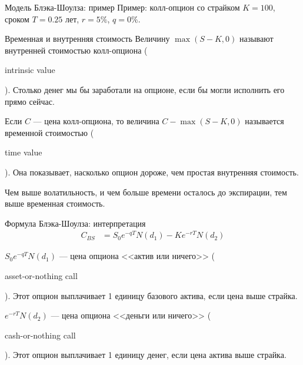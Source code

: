 \documentclass{beamer}
\newcommand{\en}[1]{\begin{otherlanguage}{english}#1\end{otherlanguage}}
\begin{document}
\begin{frame}{Модель Блэка-Шоулза: пример}
\justify
Пример: колл-опцион со страйком $K=100$, сроком $T=0.25$ лет, $r=5\%$, $q=0\%$.

\centering
{}
\end{frame}



\begin{frame}{Временная и внутренняя стоимость}
\justify
Величину $\max(S - K, 0)$ называют \alert{внутренней стоимостью} колл-опциона (\en{intrinsic value}). Столько денег мы бы заработали на опционе, если бы могли исполнить его прямо сейчас.

\justify
Если $C$ --- цена колл-опциона, то величина $C - \max(S - K, 0)$ называется \alert{временной стоимостью} (\en{time value}). Она показывает, насколько опцион дороже, чем простая внутренняя стоимость.

\justify
Чем выше волатильность, и чем больше времени осталось до экспирации, тем выше временная стоимость.
\end{frame}


\begin{frame}{Формула Блэка-Шоулза: интерпретация}
\begin{align*}
C_{BS} &= S_0e^{-qT}N(d_1) - Ke^{-rT}N(d_2)
\end{align*}

\justify
$S_0e^{-qT}N(d_1)$ --- цена опциона <<актив или ничего>> (\en{asset-or-nothing call}). Этот опцион выплачивает 1 единицу базового актива, если цена выше страйка.

\justify
$e^{-rT}N(d_2)$ --- цена опциона <<деньги или ничего>> (\en{cash-or-nothing call}). Этот опцион выплачивает 1 единицу денег, если цена актива выше страйка.
\end{frame}
\end{document}
